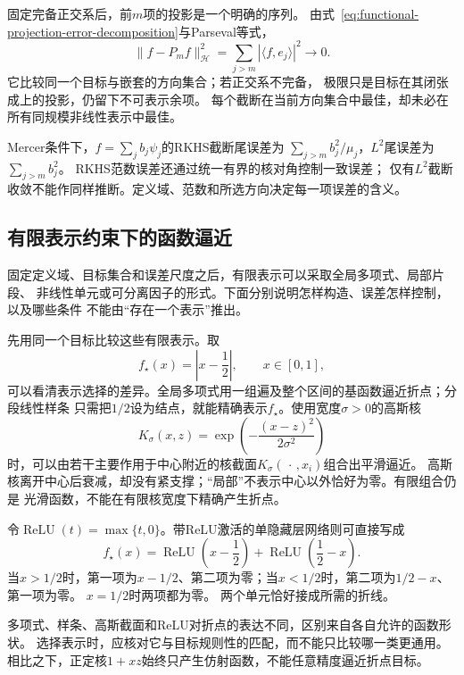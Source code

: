 固定完备正交系后，前$m$项的投影是一个明确的序列。
由式~\eqref{eq:functional-projection-error-decomposition}与Parseval等式，
\[
 \lVert f-P_mf\rVert_{\mathcal H}^2
 =\sum_{j>m}|\langle f,e_j\rangle|^2\to0.
\]
它比较同一个目标与嵌套的方向集合；若正交系不完备，
极限只是目标在其闭张成上的投影，仍留下不可表示余项。
每个截断在当前方向集合中最佳，却未必在所有同规模非线性表示中最佳。

Mercer条件下，$f=\sum_j b_j\psi_j$的RKHS截断尾误差为
$\sum_{j>m}b_j^2/\mu_j$，$L^2$尾误差为$\sum_{j>m}b_j^2$。
RKHS范数误差还通过统一有界的核对角控制一致误差；
仅有$L^2$截断收敛不能作同样推断。定义域、范数和所选方向决定每一项误差的含义。

\subsection{有限表示约束下的函数逼近}
\label{sec:functional-approximation-capacity-representation}

固定定义域、目标集合和误差尺度之后，有限表示可以采取全局多项式、局部片段、
非线性单元或可分离因子的形式。下面分别说明怎样构造、误差怎样控制，以及哪些条件
不能由“存在一个表示”推出。

先用同一个目标比较这些有限表示。取
\[
  f_\star(x)=\left|x-\frac12\right|,
  \qquad x\in[0,1],
\]
可以看清表示选择的差异。全局多项式用一组遍及整个区间的基函数逼近折点；分段线性样条
只需把$1/2$设为结点，就能精确表示$f_\star$。使用宽度$\sigma>0$的高斯核
\[
  K_\sigma(x,z)
  =
  \exp\left(-\frac{(x-z)^2}{2\sigma^2}\right)
\]
时，可以由若干主要作用于中心附近的核截面$K_\sigma(\,\cdot\,,x_i)$组合出平滑逼近。
高斯核离开中心后衰减，却没有紧支撑；“局部”不表示中心以外恰好为零。有限组合仍是
光滑函数，不能在有限核宽度下精确产生折点。

令$\operatorname{ReLU}(t)=\max\{t,0\}$。带ReLU激活的单隐藏层网络则可直接写成
\[
  f_\star(x)
  =
  \operatorname{ReLU}\left(x-\frac12\right)
  +
  \operatorname{ReLU}\left(\frac12-x\right).
\]
当$x>1/2$时，第一项为$x-1/2$、第二项为零；当$x<1/2$时，第二项为$1/2-x$、第一项为零。
$x=1/2$时两项都为零。
两个单元恰好接成所需的折线。

多项式、样条、高斯截面和ReLU对折点的表达不同，区别来自各自允许的函数形状。
选择表示时，应核对它与目标规则性的匹配，而不能只比较哪一类更通用。
相比之下，正定核$1+xz$始终只产生仿射函数，不能任意精度逼近折点目标。


